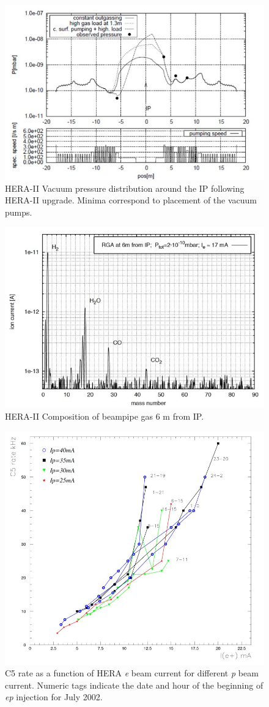 \begin{figure}
	\centering
	\includegraphics[width=.75	\textwidth]{../../img/hera_badvac_regions.jpg}
	\caption{HERA-II Vacuum pressure distribution around the IP following HERA-II upgrade.  Minima correspond to placement of the vacuum pumps.}
	\label{fig:hera1}
\end{figure}


\begin{figure}
	\centering
	\includegraphics[width=.75\textwidth]{../../img/hera_badvac_comp.jpg}	
	\caption {HERA-II Composition of beampipe gas 6 m from IP. }
	\label{fig:hera2}
\end{figure}

\begin{figure}
	\centering
	\includegraphics[width=.75\textwidth]{../../img/hera_c5_rate.jpg}
	\caption{C5 rate as a function of HERA \textit{e} beam current for different \textit{p} beam current.  Numeric tags indicate the date and hour of the beginning of \textit{ep} injection for July 2002.}
	\label{fig:hera3}
\end{figure}

